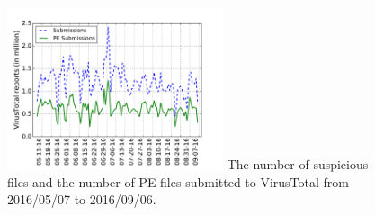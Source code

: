 \begin{figure}[t!]
\begin{center}
\includegraphics[width=2.5in]{figure/Submissions}
{
The number of suspicious files and the number of PE files submitted to VirusTotal from 2016/05/07 to 2016/09/06. 
}
\end{center}
\end{figure}
